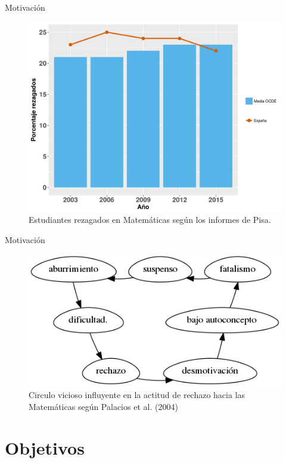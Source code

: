 \documentclass[10pt,notes,compress,usetitleprogressbar,aspectratio=1610]{beamer}
\begin{document}
\begin{frame}{Motivación}
	\begin{figure}
		\centering
		\includegraphics[scale=0.4]{../img/PisaRezagados.png}
		\caption{Estudiantes rezagados en Matemáticas según los informes de Pisa.}
	\end{figure}
\end{frame}

\begin{frame}{Motivación}
	\note{}
	\begin{figure}
		\includegraphics[scale=0.4]{../img/circuloVicioso.png}
		\caption{Circulo vicioso influyente en la actitud de rechazo hacia las Matemáticas según Palacios et al. (2004)}
	\end{figure}
\end{frame}




\section{Objetivos}
\end{document}
